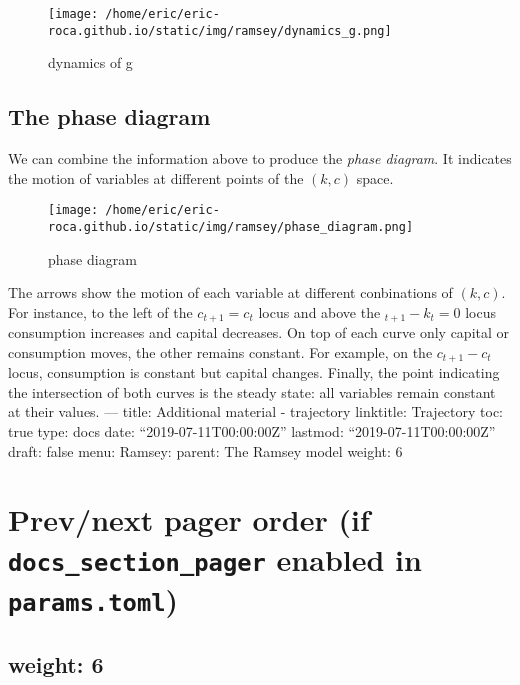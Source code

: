 \documentclass[11pt,a4paper,english]{article}
\begin{document}
\begin{figure}
\centering
\texttt{[image: /home/eric/eric-roca.github.io/static/img/ramsey/dynamics\_g.png]}
\caption{dynamics of g}
\end{figure}

\hypertarget{the-phase-diagram}{%
\subsection{The phase diagram}\label{the-phase-diagram}}

We can combine the information above to produce the \emph{phase
diagram}. It indicates the motion of variables at different points of
the \((k,c)\) space.

\begin{figure}
\centering
\texttt{[image: /home/eric/eric-roca.github.io/static/img/ramsey/phase\_diagram.png]}
\caption{phase diagram}
\end{figure}

The arrows show the motion of each variable at different conbinations of
\((k,c).\) For instance, to the left of the \(c_{t+1} = c_{t}\) locus
and above the \(_{t+1} - k_{t} = 0\) locus consumption increases and
capital decreases. On top of each curve only capital or consumption
moves, the other remains constant. For example, on the
\(c_{t+1} - c_{t}\) locus, consumption is constant but capital changes.
Finally, the point indicating the intersection of both curves is the
steady state: all variables remain constant at their values. --- title:
Additional material - trajectory linktitle: Trajectory toc: true type:
docs date: ``2019-07-11T00:00:00Z'' lastmod: ``2019-07-11T00:00:00Z''
draft: false menu: Ramsey: parent: The Ramsey model weight: 6

\hypertarget{prevnext-pager-order-if-docs_section_pager-enabled-in-params.toml-1}{%
\section{\texorpdfstring{Prev/next pager order (if
\texttt{docs\_section\_pager} enabled in
\texttt{params.toml})}{Prev/next pager order (if docs\_section\_pager enabled in params.toml)}}\label{prevnext-pager-order-if-docs_section_pager-enabled-in-params.toml-1}}

\hypertarget{weight-6}{%
\subsection{weight: 6}\label{weight-6}}
\end{document}
